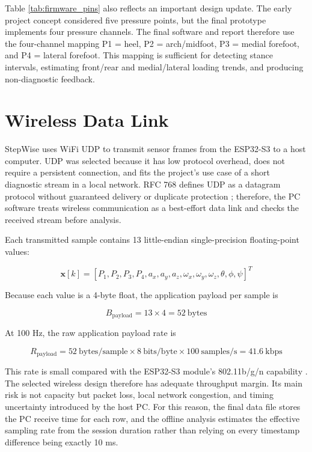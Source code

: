 Table \ref{tab:firmware_pins} also reflects an important design update. The early project concept considered five pressure points, but the final prototype implements four pressure channels. The final software and report therefore use the four-channel mapping P1 = heel, P2 = arch/midfoot, P3 = medial forefoot, and P4 = lateral forefoot. This mapping is sufficient for detecting stance intervals, estimating front/rear and medial/lateral loading trends, and producing non-diagnostic feedback.

\section{Wireless Data Link}
\label{sec:wireless_link}

StepWise uses WiFi UDP to transmit sensor frames from the ESP32-S3 to a host computer. UDP was selected because it has low protocol overhead, does not require a persistent connection, and fits the project's use case of a short diagnostic stream in a local network. RFC 768 defines UDP as a datagram protocol without guaranteed delivery or duplicate protection \cite{rfc768}; therefore, the PC software treats wireless communication as a best-effort data link and checks the received stream before analysis.

Each transmitted sample contains 13 little-endian single-precision floating-point values:

\begin{equation}
\mathbf{x}[k] =
\left[
P_1,P_2,P_3,P_4,
a_x,a_y,a_z,
\omega_x,\omega_y,\omega_z,
\theta,\phi,\psi
\right]^T
\label{eq:packet_vector}
\end{equation}

Because each value is a 4-byte float, the application payload per sample is

\begin{equation}
B_{\mathrm{payload}} = 13 \times 4 = 52~\mathrm{bytes}
\label{eq:payload_size}
\end{equation}

At 100 Hz, the raw application payload rate is

\begin{equation}
R_{\mathrm{payload}} =
52~\mathrm{bytes/sample}
\times 8~\mathrm{bits/byte}
\times 100~\mathrm{samples/s}
= 41.6~\mathrm{kbps}
\label{eq:payload_rate}
\end{equation}

This rate is small compared with the ESP32-S3 module's 802.11b/g/n capability \cite{espressif_s3_datasheet}. The selected wireless design therefore has adequate throughput margin. Its main risk is not capacity but packet loss, local network congestion, and timing uncertainty introduced by the host PC. For this reason, the final data file stores the PC receive time for each row, and the offline analysis estimates the effective sampling rate from the session duration rather than relying on every timestamp difference being exactly 10 ms.

